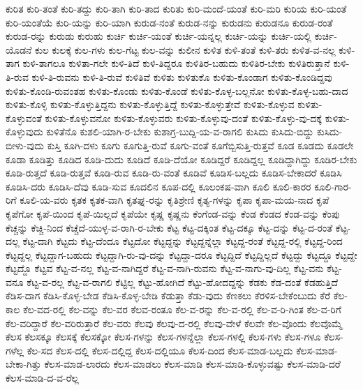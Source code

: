 {ಕುರಿತ
ಕುರಿ-ತಂತೆ
ಕುರಿ-ತದ್ದು
ಕುರಿ-ತಾಗಿ
ಕುರಿ-ತಾದ
ಕುರಿತು
ಕುರಿ-ಮಂದೆ-ಯಂತೆ
ಕುರಿ-ಮರಿ
ಕುರಿಯ
ಕುರಿ-ಯಂತೆ
ಕುರಿ-ಯಂತೆಯೆ
ಕುರಿ-ಯನ್ನು
ಕುರಿ-ಯಾಗಿ
ಕುರುಡ-ನಂತೆ
ಕುರುಡ-ನನ್ನು
ಕುರುಡನು
ಕುರುಡನೂ
ಕುರುಡ-ರಂತೆ
ಕುರುಡ-ರನ್ನು
ಕುರುಡು
ಕುರುಹು
ಕುರ್ಚಿ
ಕುರ್ಚಿ-ಯಂತೆ
ಕುರ್ಚಿ-ಯನ್ನಲ್ಲ
ಕುರ್ಚಿ-ಯನ್ನು
ಕುರ್ಚಿ-ಯಲ್ಲಿ
ಕುರ್ಚಿ-ಯೊಡನೆ
ಕುಲ
ಕುಲಕ್ಕೆ
ಕುಲ-ಗಳು
ಕುಲ-ಗೆಟ್ಟ
ಕುಲ-ವನ್ನು
ಕುಲೀನ
ಕುಳಿತ
ಕುಳಿ-ತಂತೆ
ಕುಳಿ-ತರು
ಕುಳಿತ-ವ-ನಲ್ಲ
ಕುಳಿ-ತಾಗ
ಕುಳಿ-ತಾಗಲೂ
ಕುಳಿತಾ-ಗಲೇ
ಕುಳಿ-ತಿದೆ
ಕುಳಿ-ತಿದ್ದರೂ
ಕುಳಿತಿರ-ಬಹುದು
ಕುಳಿತಿರ-ಬೇಕು
ಕುಳಿತಿರುತ್ತಾನೆ
ಕುಳಿ-ತಿ-ರುವ
ಕುಳಿ-ತಿ-ರುವನು
ಕುಳಿ-ತಿ-ರುವೆ
ಕುಳಿತಿವೆ
ಕುಳಿತು
ಕುಳಿತುಕೊ
ಕುಳಿತು-ಕೊಂಡಾಗ
ಕುಳಿತು-ಕೊಂಡಿದ್ದವು
ಕುಳಿತು-ಕೊಂಡಿ-ರುವಂತಹ
ಕುಳಿತು-ಕೊಂಡು
ಕುಳಿತು-ಕೊಂಡೆ
ಕುಳಿತು-ಕೊಳ್ಳ-ಬಲ್ಲನೋ
ಕುಳಿತು-ಕೊಳ್ಳ-ಬಹು-ದಾದ
ಕುಳಿತು-ಕೊಳ್ಳಿ
ಕುಳಿತು-ಕೊಳ್ಳುತ್ತಿದ್ದನು
ಕುಳಿತು-ಕೊಳ್ಳುತ್ತಿದ್ದೆ
ಕುಳಿತು-ಕೊಳ್ಳುತ್ತೇವೆ
ಕುಳಿತು-ಕೊಳ್ಳುವ
ಕುಳಿತು-ಕೊಳ್ಳುವಂತೆ
ಕುಳಿತು-ಕೊಳ್ಳುವನೋ
ಕುಳಿತು-ಕೊಳ್ಳುವರು
ಕುಳಿತು-ಕೊಳ್ಳುವು-ದಂತೆ
ಕುಳಿತು-ಕೊಳ್ಳು-ವು-ದಕ್ಕೆ
ಕುಳಿತು-ಕೊಳ್ಳುವುದು
ಕುಳಿತೆನೊ
ಕುಶಲಿ-ಯಾಗಿ-ರ-ಬೇಕು
ಕುಶಾಗ್ರ-ಬುದ್ದಿ-ಯ-ವ-ರಾಗಲಿ
ಕುಸಿದು
ಕುಸಿದು-ಬಿದ್ದು
ಕುಸಿದು-ಬೀಳು-ವುದು
ಕುಸ್ತಿ
ಕೂಗಿ-ದಳು
ಕೂಗು
ಕೂಗುತ್ತಿ-ರುವೆ
ಕೂಗು-ವಂತೆ
ಕೂಗೆಬ್ಬಿಸುತ್ತಿ-ರುತ್ತವೆ
ಕೂಡ
ಕೂಡದು
ಕೂಡಲೇ
ಕೂಡಾ
ಕೂಡಿತ್ತು
ಕೂಡಿದ
ಕೂಡಿ-ದುದು
ಕೂಡಿದೆ
ಕೂಡಿ-ದೆಯೋ
ಕೂಡಿದ್ದರೆ
ಕೂಡಿದ್ದಲ್ಲ
ಕೂಡಿದ್ದಾಗಿದ್ದು
ಕೂಡಿರ-ಬೇಕು
ಕೂಡಿ-ರುತ್ತದೆ
ಕೂಡಿ-ರುತ್ತವೆ
ಕೂಡಿ-ರುವ
ಕೂಡಿ-ರು-ವಂತೆ
ಕೂಡಿವೆ
ಕೂಡಿಸ-ಬಲ್ಲದು
ಕೂಡಿಸ-ಬೇಕಾದರೆ
ಕೂಡಿಸಿ
ಕೂಡಿಸಿ-ದರು
ಕೂಡಿಸಿ-ದೆವು
ಕೂಡಿ-ಸುವ
ಕೂದಲಿನ
ಕೂಪ-ದಲ್ಲಿ
ಕೂಲಂಕಷ-ವಾಗಿ
ಕೂಲಿ
ಕೂಲಿ-ಕಾರರ
ಕೂಲಿ-ಗಾರ-ರಿಗೆ
ಕೂಲಿ-ಯ-ವರು
ಕೃತಕ
ಕೃತಕ-ವಾಗಿ
ಕೃತಘ್ನ-ರನ್ನು
ಕೃತಿಶ್ರೇಣಿ
ಕೃತ್ಯ-ಗಳನ್ನು
ಕೃಪಾ
ಕೃಪಾ-ಮಯ-ನಾದ
ಕೃಪೆ
ಕೃಪೆಗೋ
ಕೃಪೆ-ಯಿಂದ
ಕೃಪೆ-ಯಿಲ್ಲದೆ
ಕೃಪೆಯೇ
ಕೃಷ್ಣ
ಕೃಷ್ಣನು
ಕೆಂಗೆಂಡ-ವನ್ನು
ಕೆಂಡ
ಕೆಂಡದ
ಕೆಂಡ-ವನ್ನು
ಕೆಂಪು
ಕೆಚ್ಚನ್ನು
ಕೆಚ್ಚಿ-ನಿಂದ
ಕೆಚ್ಚೆದೆ-ಯುಳ್ಳ-ವ-ರಾಗಿ-ರ-ಬೇಕು
ಕೆಟ್ಟ
ಕೆಟ್ಟ-ದಕ್ಕಿಂತ
ಕೆಟ್ಟ-ದಕ್ಕೂ
ಕೆಟ್ಟ-ದನ್ನು
ಕೆಟ್ಟ-ದ-ರಂತೆ
ಕೆಟ್ಟ-ದಲ್ಲ
ಕೆಟ್ಟ-ದಾಗಿ
ಕೆಟ್ಟದು
ಕೆಟ್ಟ-ದೆಂದೂ
ಕೆಟ್ಟದೋ
ಕೆಟ್ಟದ್ದನ್ನು
ಕೆಟ್ಟದ್ದನ್ನೆಲ್ಲಾ
ಕೆಟ್ಟದ್ದ-ರಂತೆ
ಕೆಟ್ಟದ್ದ-ರಲ್ಲಿ
ಕೆಟ್ಟದ್ದ-ರಿಂದ
ಕೆಟ್ಟದ್ದಲ್ಲ
ಕೆಟ್ಟದ್ದಾಗ-ಬಹುದು
ಕೆಟ್ಟದ್ದಾಗಿ-ರು-ವು-ದನ್ನು
ಕೆಟ್ಟದ್ದಾ-ದರೂ
ಕೆಟ್ಟದ್ದಿದೆ
ಕೆಟ್ಟದ್ದಿಲ್ಲದೆ
ಕೆಟ್ಟದ್ದು
ಕೆಟ್ಟದ್ದೂ
ಕೆಟ್ಟದ್ದೇ
ಕೆಟ್ಟದ್ದೊ
ಕೆಟ್ಟವ
ಕೆಟ್ಟ-ವ-ನಲ್ಲ
ಕೆಟ್ಟ-ವ-ನಾಗಿದ್ದರೆ
ಕೆಟ್ಟ-ವ-ನಾಗಿ-ರುವನು
ಕೆಟ್ಟ-ವ-ನಾಗು-ವು-ದಿಲ್ಲ
ಕೆಟ್ಟ-ವನು
ಕೆಟ್ಟ-ವನೂ
ಕೆಟ್ಟ-ವ-ರಲ್ಲ
ಕೆಟ್ಟ-ವ-ರಾಗಲಿ
ಕೆಟ್ಟಿಲ್ಲ
ಕೆಟ್ಟು-ಹೋಗಿದೆ
ಕೆಟ್ಟು-ಹೋದದ್ದನ್ನು
ಕೆಡಕು
ಕೆಡ-ದಂತೆ
ಕೆಡಹುತ್ತಿದೆ
ಕೆಡಿಸ-ದಾಗ
ಕೆಡಿಸಿ-ಕೊಳ್ಳ-ಬೇಡ
ಕೆಡಿಸಿ-ಕೊಳ್ಳ-ಬೇಡಿ
ಕೆಡುತ್ತಾ
ಕೆಡು-ವುದು
ಕೆಣಕಲು
ಕೆರಳಿಸ-ಬೇಕೆಂಬುದು
ಕೆರೆ
ಕೆಲ-ಕಾಲ
ಕೆಲ-ವದ-ರಲ್ಲಿ
ಕೆಲ-ವನ್ನು
ಕೆಲ-ವರ
ಕೆಲವ-ರಂತೂ
ಕೆಲ-ವ-ರನ್ನು
ಕೆಲ-ವ-ರಲ್ಲಿ
ಕೆಲ-ವ-ರಿ-ಗಿಂತ
ಕೆಲ-ವ-ರಿಗೆ
ಕೆಲ-ವರಿದ್ದಾರೆ
ಕೆಲ-ವರಿರುತ್ತಾರೆ
ಕೆಲ-ವರು
ಕೆಲವು
ಕೆಲವು-ದ-ರಲ್ಲಿ
ಕೆಲವು-ವೇಳೆ
ಕೆಲವೇ
ಕೆಲ-ವೊಂದು
ಕೆಲವೊಮ್ಮೆ
ಕೆಲಸ
ಕೆಲಸಕ್ಕೂ
ಕೆಲಸಕ್ಕೆ
ಕೆಲಸಕ್ಕೋ
ಕೆಲಸ-ಗಳನ್ನು
ಕೆಲಸ-ಗಳನ್ನೆಲ್ಲಾ
ಕೆಲಸ-ಗಳಲ್ಲಿ
ಕೆಲಸ-ಗಳು
ಕೆಲಸ-ಗಳೂ
ಕೆಲಸ-ಗಳೆಲ್ಲ
ಕೆಲ-ಸದ
ಕೆಲಸ-ದಲ್ಲಿ
ಕೆಲಸ-ದಲ್ಲಿದ್ದ
ಕೆಲಸ-ದಲ್ಲಿಯೂ
ಕೆಲಸ-ದಿಂದ
ಕೆಲಸ-ಮಾಡ-ಬಲ್ಲದು
ಕೆಲಸ-ಮಾಡ-ಬೇಕಾ-ಗಿತ್ತು
ಕೆಲಸ-ಮಾಡ-ಲಾರದು
ಕೆಲಸ-ಮಾಡಲು
ಕೆಲಸ-ಮಾಡಿ
ಕೆಲಸ-ಮಾಡಿ-ಕೊಳ್ಳುವಷ್ಟು
ಕೆಲಸ-ಮಾಡಿ-ದರೆ
ಕೆಲಸ-ಮಾಡಿ-ದ-ವ-ರೆಲ್ಲ
}
